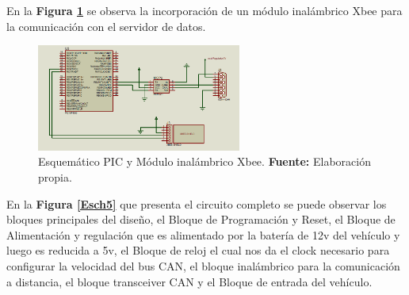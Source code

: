 


En la \textbf{Figura \ref{Esch3}} se observa la incorporación de un módulo inalámbrico Xbee para la comunicación con el servidor de datos. 


\begin{figure}[H]
	\centering
		\includegraphics[width=0.6\textwidth]{./Cap4imagen/xbee_4.png}
	\caption[Esquemático PIC y Módulo inalámbrico Xbee.]{Esquemático PIC y Módulo inalámbrico Xbee.\textbf{ Fuente:} Elaboración propia.}
	\label{Esch3} %
\end{figure}



 En la \textbf{Figura \ref{Esch5}} que presenta el circuito completo se puede observar los bloques principales del diseño, el Bloque de Programación y Reset, el Bloque de Alimentación y regulación que es alimentado por la batería de 12v del vehículo y luego es reducida a 5v, el Bloque de reloj el cual nos da el clock necesario para configurar la velocidad del bus CAN, el bloque inalámbrico para la comunicación a distancia, el bloque transceiver CAN y el Bloque de entrada del vehículo. 
 


